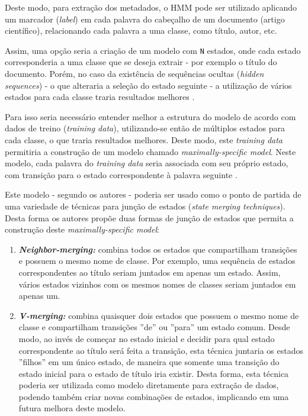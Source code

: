 Deste modo, para extração dos metadados, o HMM pode ser utilizado aplicando um marcador (\textit{label}) em cada palavra do cabeçalho de um documento (artigo científico), relacionando cada palavra a uma classe, como título, autor, etc. \begin{textonovo}Assim, uma opção seria a criação de um modelo com \texttt{N} estados, onde cada estado corresponderia a uma classe que se deseja extrair - por exemplo o título do documento. Porém, no caso da existência de sequências ocultas (\textit{hidden sequences}) - o que alteraria a seleção do estado seguinte - a utilização de vários estados para cada classe traria resultados melhores \cite{Seymore-HMM-IE}.



Para isso seria necessário entender melhor a estrutura do modelo de acordo com dados de treino (\textit{training data}), utilizando-se então de múltiplos estados para cada classe, o que traria resultados melhores. Deste modo, este \textit{training data} permitiria a construção de um modelo chamado \textit{maximally-specific model}. Neste modelo, cada palavra do \textit{training data} seria associada com seu próprio estado, com transição para o estado correspondente à palavra seguinte \cite{Seymore-HMM-IE}.

Este modelo - segundo os autores - poderia ser usado como o ponto de partida de uma variedade de técnicas para junção de estados (\textit{state merging techniques}). Desta forma os autores propõe duas formas de junção de estados que permita a construção deste \textit{maximally-specific model}:

\begin{enumerate}

\item \textit{\textbf{Neighbor-merging:}} combina todos os estados que compartilham transições e possuem o mesmo nome de classe. Por exemplo, uma sequência de estados correspondentes ao título seriam juntados em apenas um estado. Assim, vários estados vizinhos com os mesmos nomes de classes seriam juntados em apenas um.

\item \textit{\textbf{V-merging:}} combina quaisquer dois estados que possuem o mesmo nome de classe e compartilham transições ''de'' ou ''para'' um estado comum. Desde modo, ao invés de começar no estado inicial e decidir para qual estado correspondente ao título será feita a transição, esta técnica juntaria os estados ''filhos'' em um único estado, de maneira que somente uma transição do estado inicial para o estado de título iria existir. Desta forma, esta técnica poderia ser utilizada como modelo diretamente para extração de dados, podendo também criar novas combinações de estados, implicando em uma futura melhora deste modelo.


\end{enumerate}
\end{textonovo}
